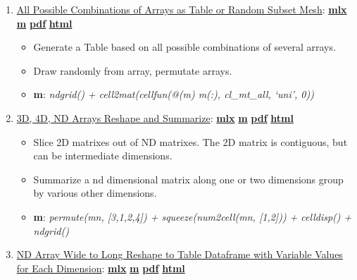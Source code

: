 \documentclass[
]{book}
\providecommand{\tightlist}{%
  \setlength{\itemsep}{0pt}\setlength{\parskip}{0pt}}
\begin{document}
\begin{enumerate}
\def\labelenumi{\arabic{enumi}.}
\tightlist
\item
  \href{https://fanwangecon.github.io/M4Econ/amto/arraynd/htmlpdfm/fs_combi_permu.html}{All Possible Combinations of Arrays as Table or Random Subset Mesh}: \href{https://github.com/FanWangEcon/M4Econ/blob/master/amto/arraynd/fs_combi_permu.mlx}{\textbf{mlx}} \textbar{} \href{https://github.com/FanWangEcon/M4Econ/blob/master/amto/arraynd/htmlpdfm/fs_combi_permu.m}{\textbf{m}} \textbar{} \href{https://github.com/FanWangEcon/M4Econ/blob/master/amto/arraynd/htmlpdfm/fs_combi_permu.pdf}{\textbf{pdf}} \textbar{} \href{https://fanwangecon.github.io/M4Econ/amto/arraynd/htmlpdfm/fs_combi_permu.html}{\textbf{html}}

  \begin{itemize}
  \tightlist
  \item
    Generate a Table based on all possible combinations of several arrays.
  \item
    Draw randomly from array, permutate arrays.
  \item
    \textbf{m}: \emph{ndgrid() + cell2mat(cellfun(@(m) m(:), cl\_mt\_all, `uni', 0))}
  \end{itemize}
\item
  \href{https://fanwangecon.github.io/M4Econ/amto/arraynd/htmlpdfm/fs_3d4dndarray.html}{3D, 4D, ND Arrays Reshape and Summarize}: \href{https://github.com/FanWangEcon/M4Econ/blob/master/amto/arraynd/fs_3d4dndarray.mlx}{\textbf{mlx}} \textbar{} \href{https://github.com/FanWangEcon/M4Econ/blob/master/amto/arraynd/htmlpdfm/fs_3d4dndarray.m}{\textbf{m}} \textbar{} \href{https://github.com/FanWangEcon/M4Econ/blob/master/amto/arraynd/htmlpdfm/fs_3d4dndarray.pdf}{\textbf{pdf}} \textbar{} \href{https://fanwangecon.github.io/M4Econ/amto/arraynd/htmlpdfm/fs_3d4dndarray.html}{\textbf{html}}

  \begin{itemize}
  \tightlist
  \item
    Slice 2D matrixes out of ND matrixes. The 2D matrix is contiguous, but can be intermediate dimensions.
  \item
    Summarize a nd dimensional matrix along one or two dimensions group by various other dimensions.
  \item
    \textbf{m}: \emph{permute(mn, {[}3,1,2,4{]}) + squeeze(num2cell(mn, {[}1,2{]})) + celldisp() + ndgrid()}
  \end{itemize}
\item
  \href{https://fanwangecon.github.io/M4Econ/amto/arraynd/htmlpdfm/fs_3d4dndarray_nan.html}{ND Array Wide to Long Reshape to Table Dataframe with Variable Values for Each Dimension}: \href{https://github.com/FanWangEcon/M4Econ/blob/master/amto/arraynd/fs_3d4dndarray_nan.mlx}{\textbf{mlx}} \textbar{} \href{https://github.com/FanWangEcon/M4Econ/blob/master/amto/arraynd/htmlpdfm/fs_3d4dndarray_nan.m}{\textbf{m}} \textbar{} \href{https://github.com/FanWangEcon/M4Econ/blob/master/amto/arraynd/htmlpdfm/fs_3d4dndarray_nan.pdf}{\textbf{pdf}} \textbar{} \href{https://fanwangecon.github.io/M4Econ/amto/arraynd/htmlpdfm/fs_3d4dndarray_nan.html}{\textbf{html}}


\end{enumerate}
\end{document}
